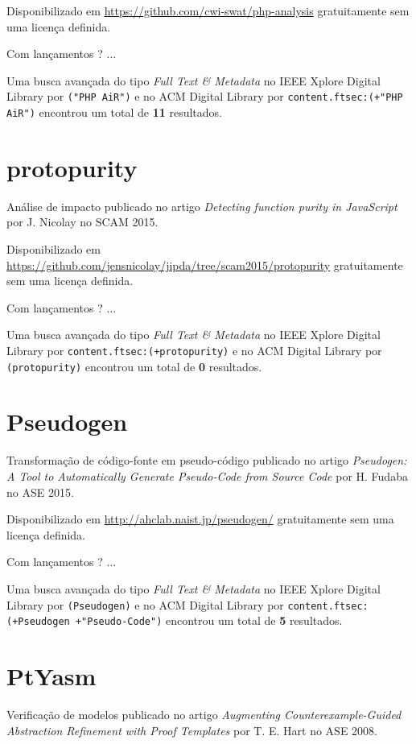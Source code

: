 Disponibilizado em \url{https://github.com/cwi-swat/php-analysis}
gratuitamente
sem uma licença definida.

Com lançamentos ? ...


Uma busca avançada do tipo {\it Full Text \& Metadata} no IEEE Xplore Digital Library por
\texttt{("PHP AiR")}
e no ACM Digital Library por
\texttt{content.ftsec:(+"PHP AiR")}
encontrou um total de
{\bf 11}
resultados.

\section{protopurity}

Análise de impacto
publicado no artigo {\it Detecting function purity in JavaScript}
por J. Nicolay
no SCAM 2015.

Disponibilizado em \url{https://github.com/jensnicolay/jipda/tree/scam2015/protopurity}
gratuitamente
sem uma licença definida.

Com lançamentos ? ...


Uma busca avançada do tipo {\it Full Text \& Metadata} no IEEE Xplore Digital Library por
\texttt{content.ftsec:(+protopurity)}
e no ACM Digital Library por
\texttt{(protopurity)}
encontrou um total de
{\bf 0}
resultados.

\section{Pseudogen}

Transformação de código-fonte em pseudo-código
publicado no artigo {\it Pseudogen: A Tool to Automatically Generate Pseudo-Code from Source Code}
por H. Fudaba
no ASE 2015.

Disponibilizado em \url{http://ahclab.naist.jp/pseudogen/}
gratuitamente
sem uma licença definida.

Com lançamentos ? ...


Uma busca avançada do tipo {\it Full Text \& Metadata} no IEEE Xplore Digital Library por
\texttt{(Pseudogen)}
e no ACM Digital Library por
\texttt{content.ftsec:(+Pseudogen +"Pseudo-Code")}
encontrou um total de
{\bf 5}
resultados.

\section{PtYasm}

Verificação de modelos
publicado no artigo {\it Augmenting Counterexample-Guided Abstraction Refinement with Proof Templates}
por T. E. Hart
no ASE 2008.

